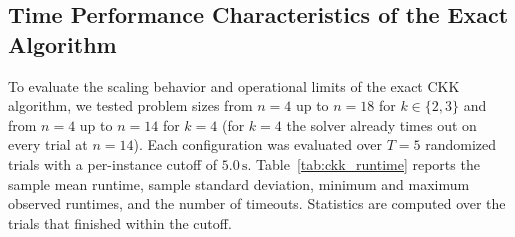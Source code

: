 \documentclass[11pt,a4paper]{article}
\begin{document}
\subsection{Time Performance Characteristics of the Exact Algorithm}
To evaluate the scaling behavior and operational limits of the exact CKK algorithm, we tested problem sizes from $n=4$ up to $n=18$ for $k\in\{2,3\}$ and from $n=4$ up to $n=14$ for $k=4$ (for $k=4$ the solver already times out on every trial at $n=14$). Each configuration was evaluated over $T=5$ randomized trials with a per-instance cutoff of $5.0\,\text{s}$. Table~\ref{tab:ckk_runtime} reports the sample mean runtime, sample standard deviation, minimum and maximum observed runtimes, and the number of timeouts. Statistics are computed over the trials that finished within the cutoff.

\begin{table}[H]
\centering


\end{table}
\end{document}
